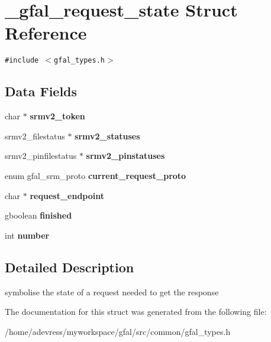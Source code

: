 \section{\_\-gfal\_\-request\_\-state Struct Reference}
\label{struct__gfal__request__state}
{\tt \#include $<$gfal\_\-types.h$>$}

\subsection*{Data Fields}
\begin{CompactItemize}
\item 
char $\ast$ \textbf{srmv2\_\-token}\label{struct__gfal__request__state_fb894137417d237a47ad4fe38a3acede}

\item 
srmv2\_\-filestatus $\ast$ \textbf{srmv2\_\-statuses}\label{struct__gfal__request__state_dd7a800ece5d4f08656d6ebb399d333b}

\item 
srmv2\_\-pinfilestatus $\ast$ \textbf{srmv2\_\-pinstatuses}\label{struct__gfal__request__state_882d10ccee4ae1a8a639cde3584b9ac9}

\item 
enum gfal\_\-srm\_\-proto \textbf{current\_\-request\_\-proto}\label{struct__gfal__request__state_e5053321643c3fc69f4a6d13878eed1a}

\item 
char $\ast$ \textbf{request\_\-endpoint}\label{struct__gfal__request__state_9125ea45c8376bf0d5e960726319934e}

\item 
gboolean \textbf{finished}\label{struct__gfal__request__state_71c0a480bb4277273a43d9b18af07929}

\item 
int \textbf{number}\label{struct__gfal__request__state_c09e0133946fddd499f424d21a87a65b}

\end{CompactItemize}


\subsection{Detailed Description}
symbolise the state of a request needed to get the response 



The documentation for this struct was generated from the following file:\begin{CompactItemize}
\item 
/home/adevress/myworkspace/gfal/src/common/gfal\_\-types.h\end{CompactItemize}
